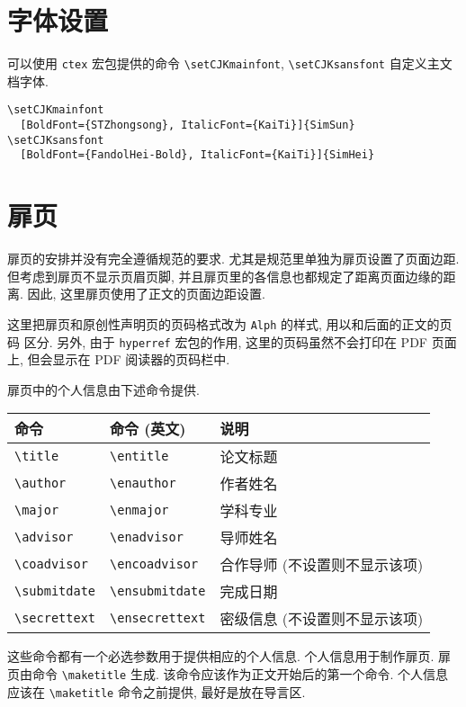 \section{字体设置}

可以使用 \verb|ctex| 宏包提供的命令 \verb|\setCJKmainfont|, \verb|\setCJKsansfont| 自定义主文档字体.
\begin{verbatim}
\setCJKmainfont
  [BoldFont={STZhongsong}, ItalicFont={KaiTi}]{SimSun}
\setCJKsansfont
  [BoldFont={FandolHei-Bold}, ItalicFont={KaiTi}]{SimHei}
\end{verbatim}

\section{扉页}

扉页的安排并没有完全遵循规范的要求. 尤其是规范里单独为扉页设置了页面边距. 但考虑到扉页不显示页眉页脚, 并且扉页里的各信息也都规定了距离页面边缘的距离. 因此, 这里扉页使用了正文的页面边距设置.

这里把扉页和原创性声明页的页码格式改为 \verb|Alph| 的样式, 用以和后面的正文的页码
区分. 另外, 由于 \verb|hyperref| 宏包的作用, 这里的页码虽然不会打印在 PDF 页面上,
但会显示在 PDF 阅读器的页码栏中.

扉页中的个人信息由下述命令提供.

\begin{center}
  \begin{tabular}{lll}
    \toprule
    命令          & 命令 (英文)     & 说明\\
    \midrule
    \verb|\title|      & \verb|\entitle|      & 论文标题\\
    \verb|\author|     & \verb|\enauthor|     & 作者姓名\\
    \verb|\major|      & \verb|\enmajor|      & 学科专业\\
    \verb|\advisor|    & \verb|\enadvisor|    & 导师姓名\\
    \verb|\coadvisor|  & \verb|\encoadvisor|  & 合作导师 (不设置则不显示该项)\\
    \verb|\submitdate| & \verb|\ensubmitdate| & 完成日期\\
    \verb|\secrettext| & \verb|\ensecrettext| & 密级信息 (不设置则不显示该项)\\
    \bottomrule
  \end{tabular}
\end{center}

这些命令都有一个必选参数用于提供相应的个人信息. 个人信息用于制作扉页. 扉页由命令 \verb|\maketitle| 生成. 该命令应该作为正文开始后的第一个命令. 个人信息应该在 \verb|\maketitle| 命令之前提供, 最好是放在导言区.

